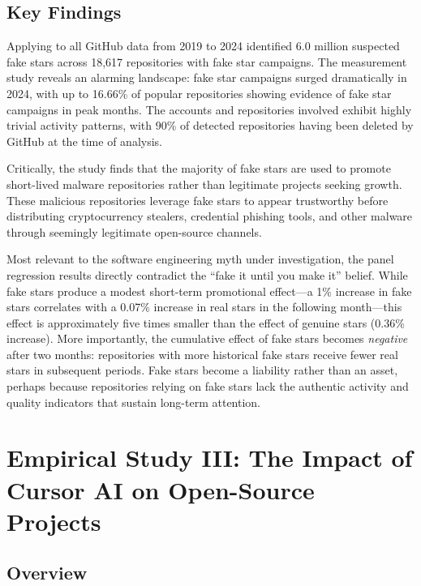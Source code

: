 \subsection{Key Findings}

Applying \SystemName to all GitHub data from 2019 to 2024 identified 6.0 million suspected fake stars across 18,617 repositories with fake star campaigns.
The measurement study reveals an alarming landscape: fake star campaigns surged dramatically in 2024, with up to 16.66\% of popular repositories showing evidence of fake star campaigns in peak months.
The accounts and repositories involved exhibit highly trivial activity patterns, with 90\% of detected repositories having been deleted by GitHub at the time of analysis.

Critically, the study finds that the majority of fake stars are used to promote short-lived malware repositories rather than legitimate projects seeking growth.
These malicious repositories leverage fake stars to appear trustworthy before distributing cryptocurrency stealers, credential phishing tools, and other malware through seemingly legitimate open-source channels.

Most relevant to the software engineering myth under investigation, the panel regression results directly contradict the ``fake it until you make it'' belief.
While fake stars produce a modest short-term promotional effect---a 1\% increase in fake stars correlates with a 0.07\% increase in real stars in the following month---this effect is approximately five times smaller than the effect of genuine stars (0.36\% increase).
More importantly, the cumulative effect of fake stars becomes \emph{negative} after two months: repositories with more historical fake stars receive fewer real stars in subsequent periods.
Fake stars become a liability rather than an asset, perhaps because repositories relying on fake stars lack the authentic activity and quality indicators that sustain long-term attention.

\section{Empirical Study III: The Impact of Cursor AI on Open-Source Projects}
\label{sec:finished-cursor}
\label{chp:cursor}

\subsection{Overview}

